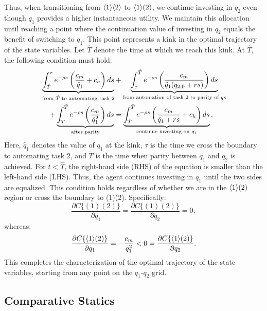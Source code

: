 \documentclass{article}
\theoremstyle{plain}
\theoremstyle{plain}
\begin{document}
Thus, when transitioning from $\langle 1 \rangle\langle 2 \rangle$ to $\langle 1 \rangle( 2 )$, we continue investing in $q_{2}$ even though $q_{1}$ provides a higher instantaneous utility. 
We maintain this allocation until reaching a point where the continuation value of investing in $q_{2}$ equals the benefit of switching to $q_{1}$. 
This point represents a kink in the optimal trajectory of the state variables. 
Let $\hat{T}$ denote the time at which we reach this kink. 
At $\hat{T}$, the following condition must hold:
\begin{equation}
\begin{split}
    & \underbrace{\int_{\hat{T}}^{\tau} e^{-\rho s} \left(\frac{c_{m}}{\hat{q}_{1}} + c_{h}\right) ds}_{\text{from \ensuremath{\hat{T}} to automating task 2}} 
    + \underbrace{\int_{\tau}^{\tilde{T}} e^{-\rho s} \left(\frac{c_{m}}{\hat{q}_{1}(q_{2,0} + rs)}\right) ds}_{\text{from automation of task 2 to parity of \ensuremath{q}s}} \\
    & \quad + \underbrace{\int_{\tilde{T}}^{\bar{T}} e^{-\rho s} \left(\frac{c_{m}}{\hat{q}_{1}^{2}}\right) ds}_{\text{after parity}} 
    = \underbrace{\int_{\hat{T}}^{\bar{T}} e^{-\rho s} \left(\frac{c_{m}}{\hat{q}_{1} + rs} + c_{h}\right) ds}_{\text{continue investing on \ensuremath{q_{1}}}}.
\end{split}
\label{eq:kink_eq}
\end{equation}
Here, $\hat{q}_{1}$ denotes the value of $q_{1}$ at the kink, $\tau$ is the time we cross the boundary to automating task 2, and $\tilde{T}$ is the time when parity between $q_{1}$ and $q_{2}$ is achieved.
For $t<\hat{T}$, the right-hand side (RHS) of the equation is smaller than the left-hand side (LHS). 
Thus, the agent continues investing in $q_{1}$ until the two sides are equalized. 
This condition holds regardless of whether we are in the $\langle 1 \rangle( 2 )$ region or cross the boundary to (1)(2). 
Specifically: 
\[
\frac{\partial C\{(1)(2)\}}{\partial q_{1}}=\frac{\partial C\{(1)(2)\}}{\partial q_{2}}=0,
\]
whereas:
\[
\frac{\partial C\{\langle 1 \rangle( 2 )\}}{\partial q_{1}}=-\frac{c_{m}}{q_{1}^{2}}<0=\frac{\partial C\{\langle 1 \rangle( 2 )\}}{\partial q_{2}}.
\]
This completes the characterization of the optimal trajectory of the state variables, starting from any point on the $q_{1}$-$q_{2}$ grid.

\subsection{Comparative Statics}
\end{document}
